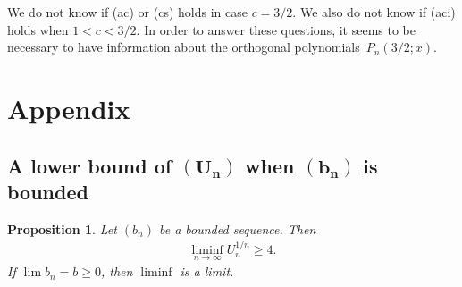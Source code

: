 \documentclass[pdftex]{sigma}
\numberwithin{equation}{section}
\newtheorem{prop}[thm]{Proposition}
\begin{document}
\begin{rem}\label{thm:rem75} We do not know if (ac) or (cs) holds in case $c=3/2$. We also do not know if (aci) holds when $1<c<3/2$. In order to answer these questions, it seems to be necessary to have information about the orthogonal polynomials~$P_n(3/2;x)$.
\end{rem}

\appendix
\section{Appendix}\label{appendixA}

\subsection[A lower bound of $(U_n)$ when $(b_n)$ is bounded]{A lower bound of $\boldsymbol{(U_n)}$ when $\boldsymbol{(b_n)}$ is bounded}

\begin{prop}\label{mean} Let $(b_n)$ be a bounded sequence. Then
\begin{gather*}
\liminf_{n\to\infty} U_n^{1/n}\ge 4.
\end{gather*}
If $\lim b_n=b\ge 0$, then $\liminf$ is a limit.
\end{prop}
\end{document}
